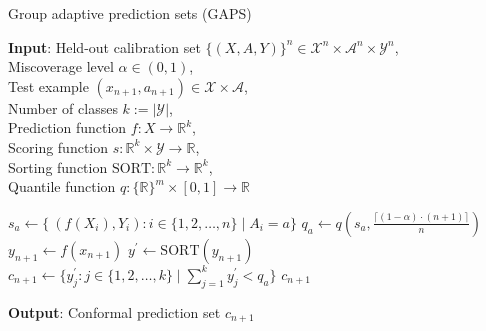 \documentclass[letterpaper]{article} %
\begin{document}
    \begin{algorithm}[tb]
        \small
        \caption{Group adaptive prediction sets (GAPS)}
        \label{alg:gaps}
        \textbf{Input}:
        Held-out calibration set $\{(X, A, Y)\}^n \in \mathcal{X}^n \times \mathcal{A}^n \times \mathcal{Y}^n$, \\
        Miscoverage level $\alpha \in (0, 1)$, \\
        Test example $\left(x_{n+1}, a_{n+1}\right) \in \mathcal{X} \times \mathcal{A}$, \\
        Number of classes $k := \lvert\mathcal{Y}\rvert$, \\
        Prediction function $f: X \rightarrow \mathbb{R}^k$, \\
        Scoring function $s: \mathbb{R}^k \times \mathcal{Y} \rightarrow \mathbb{R} $, \\
        Sorting function $\mathrm{SORT}: \mathbb{R}^k \rightarrow \mathbb{R}^k$, \\
        Quantile function $q: \{\mathbb{R}\}^m \times [0, 1] \rightarrow \mathbb{R}$\\
        \begin{algorithmic}[1] %
                \STATE $s_a \leftarrow \{\ \left(f(X_i), Y_i\right) : i \in \{1, 2, \ldots, n\} \mid A_i = a\}$
                \STATE $q_a \leftarrow q(s_a, \frac{\lceil (1 - \alpha) \cdot (n + 1) \rceil}{n})$
            \ENDFOR
                    \STATE $y_{n+1} \leftarrow f(x_{n+1})$
                    \STATE $y^\prime \leftarrow \mathrm{SORT}(y_{n+1})$
                    \STATE $c_{n+1} \leftarrow \{y^\prime_j : j \in \{1, 2, \ldots, k\} \mid \sum_{j=1}^k y^\prime_j < q_a \}$
                \ENDIF
            \ENDFOR
            \RETURN $c_{n+1}$
        \end{algorithmic}
        \textbf{Output}: Conformal prediction set $c_{n+1}$ \\
    \end{algorithm}
\end{document}
